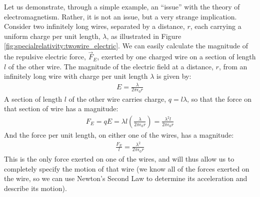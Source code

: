 Let us demonstrate, through a simple example, an ``issue'' with the theory of electromagnetism. Rather, it is not an issue, but a very strange implication. Consider two infinitely long wires, separated by a distance, $r$, each carrying a uniform charge per unit length, $\lambda$, as illustrated in Figure \ref{fig:specialrelativity:twowire_electric}. 
We can easily calculate the magnitude of the repulsive electric force, $\vec F_E$, exerted by one charged wire on a section of length $l$ of the other wire. The magnitude of the electric field at a distance, $r$, from an infinitely long wire with charge per unit length $\lambda$ is given by:
\begin{align*}
E = \frac{\lambda}{2\pi \epsilon_0r}
\end{align*}
A section of length $l$ of the other wire carries charge, $q=l\lambda$, so that the force on that section of wire has a magnitude:
\begin{align*}
F_E=qE=\lambda l \left( \frac{\lambda}{2\pi \epsilon_0r}\right) = \frac{\lambda^2 l}{2\pi \epsilon_0r}
\end{align*}
And the force per unit length, on either one of the wires, has a magnitude:
\begin{align*}
\frac{F_E}{l}=\frac{\lambda^2}{2\pi \epsilon_0r}
\end{align*}
This is the only force exerted on one of the wires, and will thus allow us to completely specify the motion of that wire (we know all of the forces exerted on the wire, so we can use Newton's Second Law to determine its acceleration and describe its motion).

